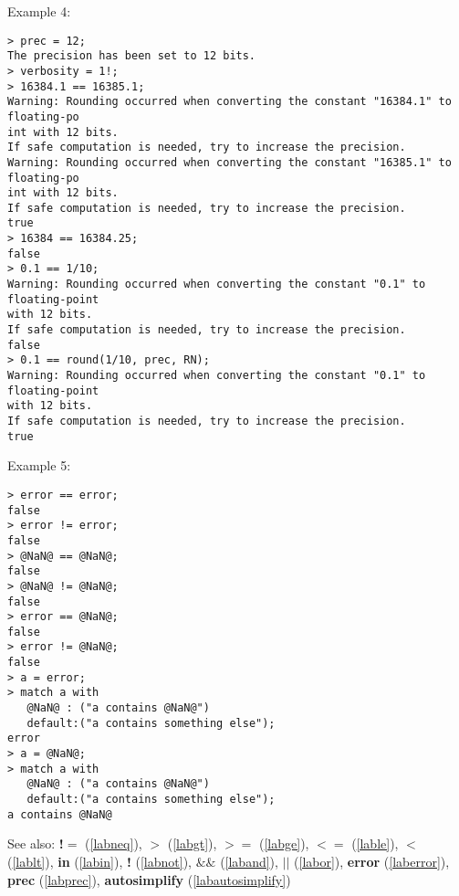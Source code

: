 \noindent Example 4: 
\begin{center}\begin{minipage}{15cm}\begin{Verbatim}[frame=single,commandchars=\\\|\~]
> prec = 12;
The precision has been set to 12 bits.
> verbosity = 1!;
> 16384.1 == 16385.1;
Warning: Rounding occurred when converting the constant "16384.1" to floating-po
int with 12 bits.
If safe computation is needed, try to increase the precision.
Warning: Rounding occurred when converting the constant "16385.1" to floating-po
int with 12 bits.
If safe computation is needed, try to increase the precision.
true
> 16384 == 16384.25;
false
> 0.1 == 1/10;
Warning: Rounding occurred when converting the constant "0.1" to floating-point 
with 12 bits.
If safe computation is needed, try to increase the precision.
false
> 0.1 == round(1/10, prec, RN);
Warning: Rounding occurred when converting the constant "0.1" to floating-point 
with 12 bits.
If safe computation is needed, try to increase the precision.
true
\end{Verbatim}
\end{minipage}\end{center}
\noindent Example 5: 
\begin{center}\begin{minipage}{15cm}\begin{Verbatim}[frame=single,commandchars=\\\|\~]
> error == error;
false
> error != error;
false
> @NaN@ == @NaN@;
false
> @NaN@ != @NaN@;
false
> error == @NaN@;
false
> error != @NaN@;
false
> a = error;
> match a with
   @NaN@ : ("a contains @NaN@")
   default:("a contains something else");
error
> a = @NaN@;
> match a with
   @NaN@ : ("a contains @NaN@")
   default:("a contains something else");
a contains @NaN@
\end{Verbatim}
\end{minipage}\end{center}
See also: \textbf{!$=$} (\ref{labneq}), \textbf{$>$} (\ref{labgt}), \textbf{$>=$} (\ref{labge}), \textbf{$<=$} (\ref{lable}), \textbf{$<$} (\ref{lablt}), \textbf{in} (\ref{labin}), \textbf{!} (\ref{labnot}), \textbf{$\&\&$} (\ref{laband}), \textbf{$||$} (\ref{labor}), \textbf{error} (\ref{laberror}), \textbf{prec} (\ref{labprec}), \textbf{autosimplify} (\ref{labautosimplify})
